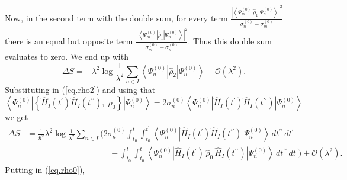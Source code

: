 \documentclass[11pt]{article}
\newcommand{\Od}[1]{\mathcal{O}{\left(#1\right)}}
\newcommand{\bra}[1]{\left\langle#1\right|}
\newcommand{\ket}[1]{\left|#1\right\rangle}
\newcommand{\op}[1]{\hat{#1}}
\theoremstyle{theorem}
\theoremstyle{remark}
\theoremstyle{step}
\theoremstyle{gap}
\begin{document}
Now, in the second term with the double sum, for every term \(\frac{\left|\bra{\Psi_m^{(0)}} \op{\rho}_1 \ket{\Psi_n^{(0)}}\right|^2}{\sigma_n^{(0)}-\sigma_m^{(0)}}\) there is an equal but opposite term \(\frac{\left|\bra{\Psi_m^{(0)}} \op{\rho}_1 \ket{\Psi_n^{(0)}}\right|^2}{\sigma_m^{(0)}-\sigma_n^{(0)}}\). Thus this double sum evaluates to zero. We end up with
\begin{equation}\label{eq.entropyresultwithrho2}
\boxed{\Delta S = -\lambda^2 \log\frac{1}{\lambda^2}\sum_{n \in I} \bra{\Psi_n^{(0)}}\op{\rho}_2\ket{\Psi_n^{(0)}} + \Od{\lambda^2}.}
\end{equation}
Substituting in (\ref{eq.rho2}) and using that
\[
\bra{\Psi_n^{(0)}} \left\{ \op{H}_I (t^\prime) \op{H}_I(t^{\prime\prime}),\; \op{\rho}_0 \right\} \ket{\Psi_n^{(0)}} = 2 \sigma_n^{(0)} \bra{\Psi_n^{(0)}} \op{H}_I (t^\prime) \op{H}_I(t^{\prime\prime}) \ket{\Psi_n^{(0)}}
\]
we get
\begin{align}\label{entropyresultwithHI}
\Delta S &= \frac{1}{\hbar^2}\lambda^2 \log\frac{1}{\lambda^2}\sum_{n \in I} \Bigg(2 \sigma_n^{(0)} \int_{t_0}^t \int_{t_0}^{t^\prime} \bra{\Psi_n^{(0)}} \op{H}_I (t^\prime) \op{H}_I(t^{\prime\prime}) \ket{\Psi_n^{(0)}}\,dt^{\prime\prime}\,dt^\prime \\
&\hspace{10em}- \int_{t_0}^t \int_{t_0}^{t} \bra{\Psi_n^{(0)}}\op{H}_I (t^\prime) \,\op{\rho}_0\, \op{H}_I (t^{\prime\prime})\ket{\Psi_n^{(0)}}\,dt^{\prime\prime}\,dt^\prime \Bigg) + \Od{\lambda^2}.\nonumber
\end{align}
Putting in (\ref{eq.rho0}),
\end{document}
